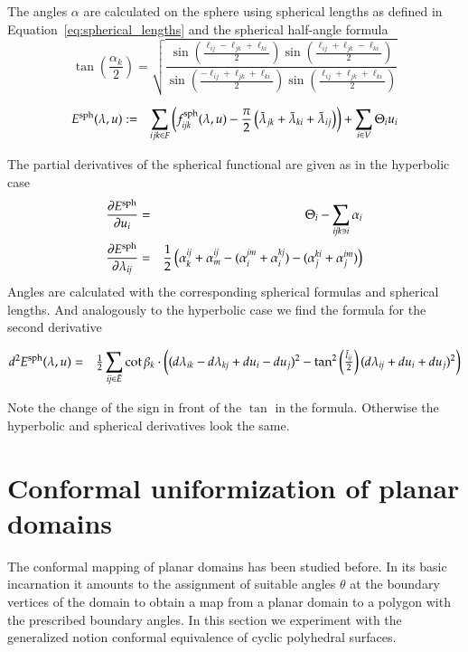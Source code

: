 \documentclass[Thesis.tex]{subfiles}
\begin{document}
The angles $\alpha$ are calculated on the sphere using spherical lengths as defined in 
Equation~\ref{eq:spherical_lengths} and the spherical half-angle formula
\[
  \tan\left(\frac{\alpha_k}{2}\right)=
  \sqrt{\frac{
      \sin(\frac{\ell_{ij}-\ell_{jk}+\ell_{ki}}{2})
      \sin(\frac{\ell_{ij}+\ell_{jk}-\ell_{ki}}{2})
    }{
      \sin(\frac{-\ell_{ij}+\ell_{jk}+\ell_{ki}}{2})
      \sin(\frac{\ell_{ij}+\ell_{jk}+\ell_{ki}}{2})
    }}
\]

\begin{eqnarray}
	E^{\rm sph}(\lambda, u) &:=& \sum_{ijk\in F}\left(f_{\it ijk}^{\rm sph}(\lambda, u) - \frac{\pi}{2}\left(\tilde \lambda_{jk} + \tilde \lambda_{ki} + \tilde \lambda_{ij}\right)\right) + \sum_{i\in V} \Theta_i u_i
\end{eqnarray}

The partial derivatives of the spherical functional are given as in the hyperbolic case
\begin{eqnarray}
	\frac{\partial E^{\rm sph}}{\partial u_i} &=& \Theta_i - \sum_{\it ijk\ni i}\alpha_i \\
	\frac{\partial E^{\rm sph}}{\partial \lambda_{\it ij}} &=& 
	\frac{1}{2}\left(\alpha_k^{\it ij} + \alpha_m^{\it ij} - (\alpha_i^{\it jm} + \alpha_i^{\it kj}) - (\alpha_j^{\it ki} + \alpha_j^{\it im})\right)
\end{eqnarray}
Angles are calculated with the corresponding spherical formulas and spherical lengths.
And analogously to the hyperbolic case we find the formula for the second derivative

\begin{eqnarray*}
d^2E^{\rm sph}(\lambda, u)
&=& \tfrac{1}{2}\sum_{\it ij\in \bar{E}} \cot\beta_k \cdot 
 \left((d\lambda_{\it ik}-d\lambda_{\it kj} +  du_i-du_j)^2-\tan^2\left(\tfrac{\tilde l_{\it ij}}{2}\right)(d\lambda_{\it ij} +du_i+du_j)^2\right)
\end{eqnarray*}

Note the change of the sign in front of the $\tan$ in the formula. Otherwise the hyperbolic and spherical 
derivatives look the same.


\section{Conformal uniformization of planar domains}

The conformal mapping of planar domains has been studied before. In its basic incarnation it amounts
to the assignment of suitable angles $\theta$ at the boundary vertices of the domain to obtain a map from a 
planar domain to a polygon with the prescribed boundary angles. In this section we experiment with 
the generalized notion conformal equivalence of cyclic polyhedral surfaces.
\end{document}
